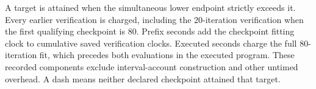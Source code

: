 \noindent A target is attained when the simultaneous lower endpoint strictly exceeds it. Every earlier verification is charged, including the 20-iteration verification when the first qualifying checkpoint is 80. Prefix seconds add the checkpoint fitting clock to cumulative saved verification clocks. Executed seconds charge the full 80-iteration fit, which precedes both evaluations in the executed program. These recorded components exclude interval-account construction and other untimed overhead. A dash means neither declared checkpoint attained that target.
\endgroup
